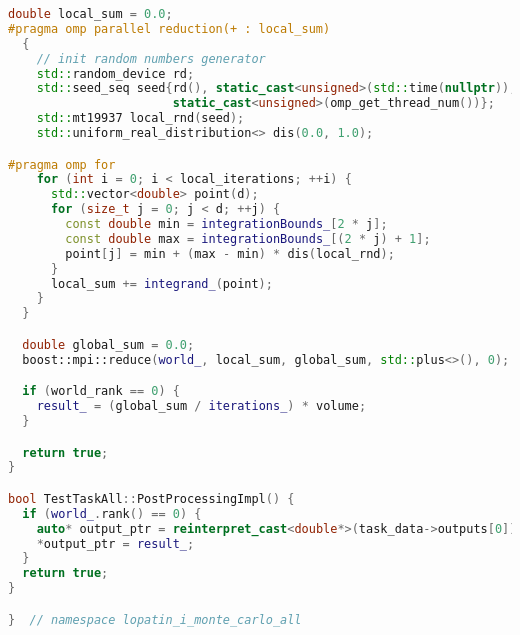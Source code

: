\documentclass[12pt,a4paper]{extarticle}
\begin{document}
\begin{lstlisting}[language=C++]
  double local_sum = 0.0;
#pragma omp parallel reduction(+ : local_sum)
  {
    // init random numbers generator
    std::random_device rd;
    std::seed_seq seed{rd(), static_cast<unsigned>(std::time(nullptr)), static_cast<unsigned>(world_rank),
                       static_cast<unsigned>(omp_get_thread_num())};
    std::mt19937 local_rnd(seed);
    std::uniform_real_distribution<> dis(0.0, 1.0);

#pragma omp for
    for (int i = 0; i < local_iterations; ++i) {
      std::vector<double> point(d);
      for (size_t j = 0; j < d; ++j) {
        const double min = integrationBounds_[2 * j];
        const double max = integrationBounds_[(2 * j) + 1];
        point[j] = min + (max - min) * dis(local_rnd);
      }
      local_sum += integrand_(point);
    }
  }

  double global_sum = 0.0;
  boost::mpi::reduce(world_, local_sum, global_sum, std::plus<>(), 0);

  if (world_rank == 0) {
    result_ = (global_sum / iterations_) * volume;
  }

  return true;
}

bool TestTaskAll::PostProcessingImpl() {
  if (world_.rank() == 0) {
    auto* output_ptr = reinterpret_cast<double*>(task_data->outputs[0]);
    *output_ptr = result_;
  }
  return true;
}

}  // namespace lopatin_i_monte_carlo_all
\end{lstlisting}
\end{document}
